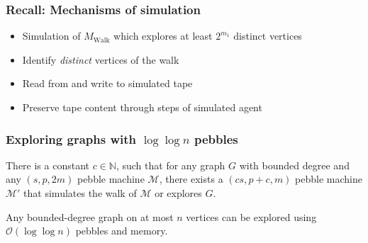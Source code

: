 \documentclass{beamer}
\begin{document}
\begin{frame}
  \frametitle{Recall: Mechanisms of simulation}
  \begin{itemize}
    \item Simulation of $M_{\text{Walk}}$ which explores at least $2^{m_{1}}$
      distinct vertices 
    \item Identify \emph{distinct} vertices of the walk
    \item Read from and write to simulated tape 
    \item Preserve tape content through steps of simulated agent
  \end{itemize}
\end{frame}

\begin{frame}
  \frametitle{Exploring graphs with $\log\log n$ pebbles}
  \begin{theorem}
    There is a constant $c\in\mathbb{N}$, such that for any graph $G$
    with bounded degree and any $(s,p,2m)$ pebble machine $\mathcal{M}$,
    there exists a $(cs,p+c,m)$ pebble machine $\mathcal{M}'$ that simulates
    the walk of $\mathcal{M}$ or explores $G$.
  \end{theorem}
  \begin{center}
  \end{center}
  \begin{theorem}
    Any bounded-degree graph on at most $n$ vertices can be explored using
    $\mathcal{O}(\log\log n)$ pebbles and memory.
  \end{theorem}
\end{frame}
\end{document}
